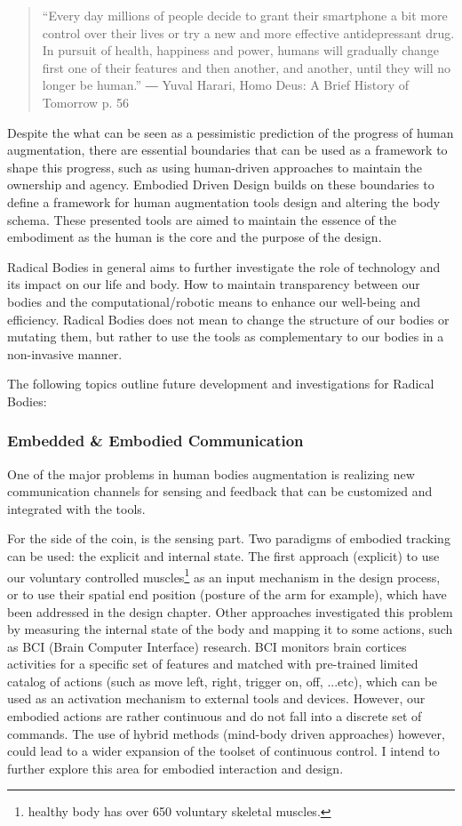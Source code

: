 \begin{quote}
    
``Every day millions of people decide to grant their smartphone a bit more control over their lives or try a new and more effective antidepressant drug. In pursuit of health, happiness and power, humans will gradually change first one of their features and then another, and another, until they will no longer be human.''
― Yuval Harari, Homo Deus: A Brief History of Tomorrow p. 56
\end{quote}

Despite the what can be seen as a pessimistic prediction of the progress of human augmentation, there are essential boundaries that can be used as a framework to shape this progress, such as using human-driven approaches to maintain the ownership and agency. Embodied Driven Design builds on these boundaries to define a framework for human augmentation tools design and altering the body schema. These presented tools are aimed to maintain the essence of the embodiment as the human is the core and the purpose of the design.

Radical Bodies in general aims to further investigate the role of technology and its impact on our life and body. How to maintain transparency between our bodies and the computational/robotic means to enhance our well-being and efficiency. Radical Bodies does not mean to change the structure of our bodies or mutating them, but rather to use the tools as complementary to our bodies in a non-invasive manner. 

The following topics outline future development and investigations for Radical Bodies:

\subsubsection*{Embedded \& Embodied Communication}

One of the major problems in human bodies augmentation is realizing new communication channels for sensing and feedback that can be customized and integrated with the tools.

For the side of the coin, is the sensing part. Two paradigms of embodied tracking can be used: the explicit and internal state. The first approach (explicit) to use our voluntary controlled muscles\footnote{healthy body has over 650 voluntary skeletal muscles.} as an input mechanism in the design process, or to use their spatial end position (posture of the arm for example), which have been addressed in the design chapter. Other approaches investigated this problem by measuring the internal state of the body and mapping it to some actions, such as BCI (Brain Computer Interface) research. BCI monitors brain cortices activities for a specific set of features and matched with pre-trained limited catalog of actions (such as move left, right, trigger on, off, ...etc), which can be used as an activation mechanism to external tools and devices. However, our embodied actions are rather continuous and do not fall into a discrete set of commands. The use of hybrid methods (mind-body driven approaches) however, could lead to a wider expansion of the toolset of continuous control. I intend to further explore this area for embodied interaction and design. 


